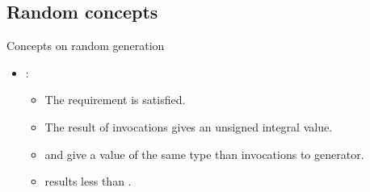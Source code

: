 \subsection{Random concepts}

\begin{frame}[t,fragile]{Concepts on random generation}
\begin{itemize}
  \item {}:
    \begin{itemize}
      \item The requirement  is satisfied.
      \item The result of invocations gives an unsigned integral value.
      \item {} and  give a value of the same type 
            than invocations to generator.
      \item {} results less than .
    \end{itemize}
\end{itemize}
\end{frame}
